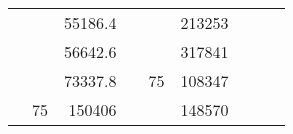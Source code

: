 \begin{table}[]
\begin{tabular}{|ccrccrccc}
\multicolumn{1}{|c|}{\cellcolor[HTML]{FFFFC7}}                                & \multicolumn{1}{c|}{\cellcolor[HTML]{DAE8FC}}                      & \multicolumn{1}{r|}{\cellcolor[HTML]{DAE8FC}55186.4}   & \multicolumn{1}{c|}{\cellcolor[HTML]{FFFFC7}}                                & \multicolumn{1}{c|}{\cellcolor[HTML]{DAE8FC}}                       & \multicolumn{1}{r|}{\cellcolor[HTML]{DDFDFF}213253}    &                                                                              &                                                                    &                                                        \\ \cline{3-3} \cline{6-6}
\multicolumn{1}{|c|}{\cellcolor[HTML]{FFFFC7}}                                & \multicolumn{1}{c|}{\cellcolor[HTML]{DAE8FC}}                      & \multicolumn{1}{r|}{\cellcolor[HTML]{DDFDFF}56642.6}   & \multicolumn{1}{c|}{\cellcolor[HTML]{FFFFC7}}                                & \multicolumn{1}{c|}{\cellcolor[HTML]{DAE8FC}}                       & \multicolumn{1}{r|}{\cellcolor[HTML]{DAE8FC}317841}    &                                                                              &                                                                    &                                                        \\ \cline{3-3} \cline{6-6}
\multicolumn{1}{|c|}{\cellcolor[HTML]{FFFFC7}}                                & \multicolumn{1}{c|}{\cellcolor[HTML]{DAE8FC}}                      & \multicolumn{1}{r|}{\cellcolor[HTML]{DAE8FC}73337.8}   & \multicolumn{1}{c|}{\cellcolor[HTML]{FFFFC7}}                                & \multicolumn{1}{c|}{\multirow{-10}{*}{\cellcolor[HTML]{DAE8FC}75}}  & \multicolumn{1}{r|}{\cellcolor[HTML]{DDFDFF}108347}    &                                                                              &                                                                    &                                                        \\ \cline{3-3} \cline{5-6}
\multicolumn{1}{|c|}{\cellcolor[HTML]{FFFFC7}}                                & \multicolumn{1}{c|}{\multirow{-10}{*}{\cellcolor[HTML]{DAE8FC}75}} & \multicolumn{1}{r|}{\cellcolor[HTML]{DDFDFF}150406}    & \multicolumn{1}{c|}{\cellcolor[HTML]{FFFFC7}}                                & \multicolumn{1}{c|}{\cellcolor[HTML]{DDFDFF}}                       & \multicolumn{1}{r|}{\cellcolor[HTML]{DAE8FC}148570}    &                                                                              &                                                                    &                                                        \\ \cline{2-3} \cline{6-6}

\end{tabular}
\end{table}
